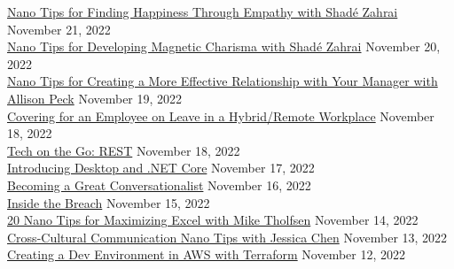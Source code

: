 \documentclass[10pt]{res} %
\begin{document}
\begin{resume}
\href{https://www.linkedin.com/learning/certificates/393b7f3f6390562929a59e457ee69150a96c0515552d480ca7b76fc0cb378d1b}{\color{blue}Nano Tips for Finding Happiness Through Empathy with Shadé Zahrai} \hfill November 21, 2022 \\
\href{https://www.linkedin.com/learning/certificates/fab6b565b332ae77843cdb5ea3fa981deb520a086d95405fab9b74cb82c2d95a}{\color{blue}Nano Tips for Developing Magnetic Charisma with Shadé Zahrai} \hfill November 20, 2022 \\
\href{https://www.linkedin.com/learning/certificates/6203909aac00780dfb3b96f89dc4422b909f533ad3b581dcabeb918bc9bd288d}{\color{blue}Nano Tips for Creating a More Effective Relationship with Your Manager with Allison Peck} \hfill November 19, 2022 \\
\href{https://www.linkedin.com/learning/certificates/676827092d9abfcc8564f2aa167cf33fef21dcbb94f33cbb99c2361fbccd4945}{\color{blue}Covering for an Employee on Leave in a Hybrid/Remote Workplace} \hfill November 18, 2022 \\
\href{https://www.linkedin.com/learning/certificates/5f644855128e3f33b8ad0425e8d08d38a5a96814aac1760d794bb86e9d00b346}{\color{blue}Tech on the Go: REST} \hfill November 18, 2022 \\
\href{https://www.linkedin.com/learning/certificates/5d55dfbf8ba2cb969069062ff3f4c268a9e86709e639a8782c132fcb84c15888}{\color{blue}Introducing Desktop and .NET Core} \hfill November 17, 2022 \\
\href{https://www.linkedin.com/learning/certificates/7cf6cd2cbe0c0bb69931bef9a7c909264ef9892b734e1b4c842d17a6a50d7cee}{\color{blue}Becoming a Great Conversationalist} \hfill November 16, 2022 \\
\href{https://www.linkedin.com/learning/certificates/85ffac1b4b2cabe08a5a8eb10d0f28d2cb1ae640a111f97d704b9ffaa47a6671}{\color{blue}Inside the Breach} \hfill November 15, 2022 \\
\href{https://www.linkedin.com/learning/certificates/1468729bf4fa1ebe282ad45f1b62ed5121eb14e3b2fb7db73778a35dfd14a487}{\color{blue}20 Nano Tips for Maximizing Excel with Mike Tholfsen} \hfill November 14, 2022 \\
\href{https://www.linkedin.com/learning/certificates/30ee117f310e91683181461dd3638a348cb93d782571c45b1b28fd855cdfe3db}{\color{blue}Cross-Cultural Communication Nano Tips with Jessica Chen} \hfill November 13, 2022 \\
\href{https://www.linkedin.com/learning/certificates/1b368bd928fa2f36f533caa27c80989c814ad9312c0786dbb4fb6c4268da44ee}{\color{blue}Creating a Dev Environment in AWS with Terraform} \hfill November 12, 2022 \\

\end{resume}
\end{document}
